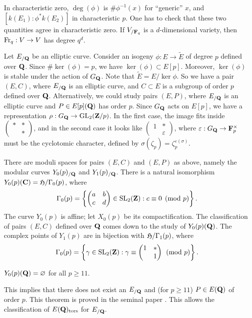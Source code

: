 In characteristic zero, $\deg(\phi)$ is $\# \phi^{-1}(x)$ for ``generic'' 
$x$, and $[k(E_1):\phi^\ast k(E_2)]$ in characteristic $p$. One has to check 
that these two quantities agree in characteristic zero. If $V_{/\mathbf{F}_q}$ is a 
$d$-dimensional variety, then $\operatorname{Fr}_q:V\to V$ has degree $q^d$. 

Let $E_{/\mathbf{Q}}$ be an elliptic curve. Consider an isogeny 
$\phi:E\to \widetilde E$ of degree $p$ defined over $\mathbf{Q}$. Since 
$\#\ker(\phi)=p$, we have $\ker(\phi)\subset E[p]$. Moreover, $\ker(\phi)$ is 
stable under the action of $G_{\mathbf{Q}}$. Note that $\widetilde E=E/\ker\phi$. So we 
have a pair $(E,C)$, where $E_{/\mathbf{Q}}$ is an elliptic curve, and $C\subset E$ is 
a subgroup of order $p$ defined over $\mathbf{Q}$. Alternatively, we could study pairs 
$(E,P)$, where $E_{/\mathbf{Q}}$ is an elliptic curve and $P\in E[p](\mathbf{Q})$ has order 
$p$. Since $G_{\mathbf{Q}}$ acts on $E[p]$, we have a representation 
$\rho:G_{\mathbf{Q}}\to \operatorname{GL}_2(\mathbf{Z}/p)$. In the first case, the image fits inside 
$\begin{pmatrix} \ast & \ast \\ & \ast \end{pmatrix}$, and in 
the second case it looks like 
$\begin{pmatrix} 1 & \ast \\ & \varepsilon\end{pmatrix}$, 
where $\varepsilon:G_{\mathbf{Q}}\to \mathbf{F}_p^\times$ must be the cyclotomic character, 
defined by $\sigma(\zeta_p) = \zeta_p^{\varepsilon(\sigma)}$. 

There are moduli spaces for pairs $(E,C)$ and $(E,P)$ as above, namely the 
modular curves $Y_0(p)_{/\mathbf{Q}}$ and $Y_1(p)_{/\mathbf{Q}}$. There is a natural 
isomorphism $Y_0(p)(\mathbf{C}) = \mathfrak{H}/\Gamma_0(p)$, where 
\[
  \Gamma_0(p) = \left\{\begin{pmatrix} a & b \\ c & d \end{pmatrix}\in \operatorname{SL}_2(\mathbf{Z}):c\equiv 0\pmod p\right\} .
\]
The curve $Y_0(p)$ is affine; let $X_0(p)$ be its compactification. The 
classification of pairs $(E,C)$ defined over $\mathbf{Q}$ comes down to the study of 
$Y_0(p)(\mathbf{Q})$. The complex points of $Y_1(p)$ are in bijection with 
$\mathfrak{H}/\Gamma_1(p)$, where 
\[
  \Gamma_0(p) = \left\{\gamma\in \operatorname{SL}_2(\mathbf{Z}):\gamma\equiv \begin{pmatrix} 1 & \ast \\ & 1 \end{pmatrix} \pmod p\right\} .
\]

\begin{theorem}[Mazur]
$Y_0(p)(\mathbf{Q})=\varnothing$ for all $p\geqslant 11$. 
\end{theorem}

This implies that there does not exist an $E_{/\mathbf{Q}}$ and (for $p\geqslant 11$) 
$P\in E(\mathbf{Q})$ of order $p$. This theorem is proved in the seminal paper 
\cite{mazur-1977}. This allows the classification of $E(\mathbf{Q})_\mathrm{tors}$ for 
$E_{/\mathbf{Q}}$. 




